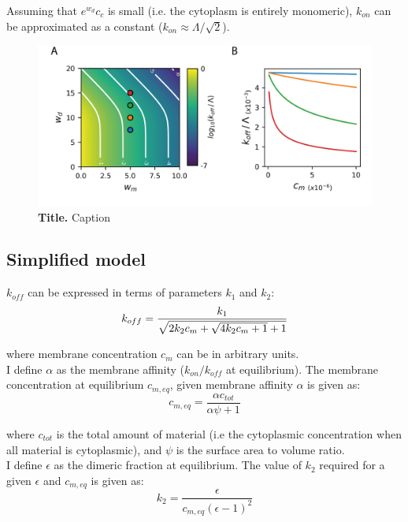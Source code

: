 \documentclass[12pt]{"report"}
\newcommand{\mycaption}[2]{\caption[#1]{\textbf{#1.} #2}}
\begin{document}
Assuming that $e^{w_d} c_c$ is small (i.e. the cytoplasm is entirely monomeric), $k_{on}$ can be approximated as a constant ($k_{on} \approx \Lambda / \sqrt{2}$).



\begin{figure}
\includegraphics[scale=1]{thermodynamic_model_koff}
\centering
\mycaption{Title}{Caption}
\label{fig:thermodynamic_model_koff}
\end{figure}


\subsection{Simplified model}

$k_{off}$ can be expressed in terms of parameters $k_1$ and $k_2$:
\begin{equation}
k_{off} = \frac{k_1}{\sqrt{2 k_2 c_m + \sqrt{4 k_2 c_m + 1} + 1}}\\
\end{equation}

where membrane concentration $c_m$ can be in arbitrary units.\\

I define $\alpha$ as the membrane affinity ($k_{on} / k_{off}$ at equilibrium). The membrane concentration at equilibrium $c_{m, eq}$, given membrane affinity $\alpha$ is given as:
\begin{equation}
c_{m, eq} = \frac{\alpha c_{tot}}{\alpha \psi + 1}
\end{equation}

where $c_{tot}$ is the total amount of material (i.e the cytoplasmic concentration when all material is cytoplasmic), and $\psi$ is the surface area to volume ratio.\\

I define $\epsilon$ as the dimeric fraction at equilibrium. The value of $k_2$ required for a given $\epsilon$ and $c_{m, eq}$ is given as:
\begin{equation}
k_2 = \frac{\epsilon}{c_{m, eq} (\epsilon - 1)^2}
\end{equation}
\end{document}

